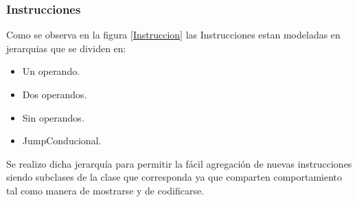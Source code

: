 
\subsubsection{Instrucciones}
Como se observa en la figura \ref{Instruccion} las Instrucciones estan modeladas en jerarquias que se dividen en:

\begin{itemize}
\item Un operando.
\item Dos operandos.
\item Sin operandos.
\item JumpConducional.
\end{itemize}

Se realizo dicha jerarquía para permitir la fácil agregación de nuevas instrucciones siendo subclases de la clase que corresponda ya que comparten comportamiento tal como manera de mostrarse y de codificarse.


